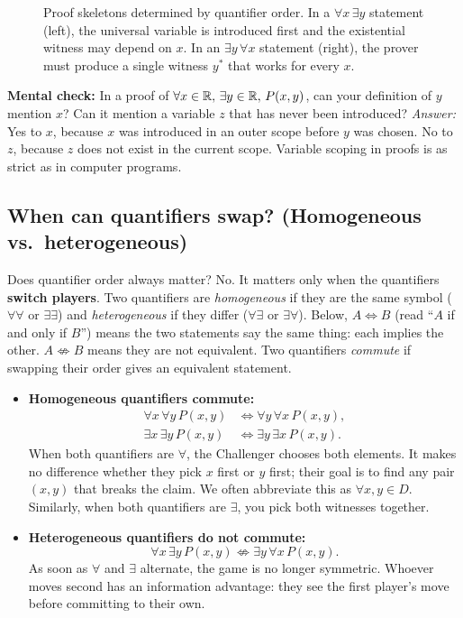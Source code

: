\begin{figure}[htbp]
\begin{tikzpicture}[
    font=\small,
    proofcard/.style={draw=#1!70!black, fill=#1!4, rounded corners=4pt, thick, text width=6.0cm, inner sep=7pt}
]
\end{tikzpicture}
\caption{Proof skeletons determined by quantifier order. In a $\forall x \, \exists y$ statement (left), the universal variable is introduced first and the existential witness may depend on $x$. In an $\exists y \, \forall x$ statement (right), the prover must produce a single witness $y^*$ that works for every $x$.}
\label{04:fig-proof-skeletons}
\end{figure}

\begin{recoverybox}
\textbf{Mental check:} In a proof of $\forall x \in \mathbb{R}, \, \exists y \in \mathbb{R}, \, P(x, y)$, can your definition of $y$ mention $x$? Can it mention a variable $z$ that has never been introduced?
\emph{Answer:} Yes to $x$, because $x$ was introduced in an outer scope before $y$ was chosen. No to $z$, because $z$ does not exist in the current scope. Variable scoping in proofs is as strict as in computer programs.
\end{recoverybox}

\subsection{When can quantifiers swap? (Homogeneous vs.\ heterogeneous)}

Does quantifier order always matter? No. It matters only when the quantifiers \textbf{switch players}. Two quantifiers are \emph{homogeneous} if they are the same symbol ($\forall\forall$ or $\exists\exists$) and \emph{heterogeneous} if they differ ($\forall\exists$ or $\exists\forall$). Below, $A \iff B$ (read ``$A$ if and only if $B$'') means the two statements say the same thing: each implies the other. $A \not\iff B$ means they are not equivalent. Two quantifiers \emph{commute} if swapping their order gives an equivalent statement.
\begin{itemize}
\item \textbf{Homogeneous quantifiers commute:}
\[
\begin{aligned}
\forall x \, \forall y \, P(x, y) &\iff \forall y \, \forall x \, P(x, y),\\
\exists x \, \exists y \, P(x, y) &\iff \exists y \, \exists x \, P(x, y).
\end{aligned}
\]
When both quantifiers are $\forall$, the Challenger chooses both elements. It makes no difference whether they pick $x$ first or $y$ first; their goal is to find any pair $(x, y)$ that breaks the claim. We often abbreviate this as $\forall x, y \in D$. Similarly, when both quantifiers are $\exists$, you pick both witnesses together.
\item \textbf{Heterogeneous quantifiers do not commute:}
\[
\forall x \, \exists y \, P(x, y) \not\iff \exists y \, \forall x \, P(x, y).
\]
As soon as $\forall$ and $\exists$ alternate, the game is no longer symmetric. Whoever moves second has an information advantage: they see the first player's move before committing to their own.
\end{itemize}

